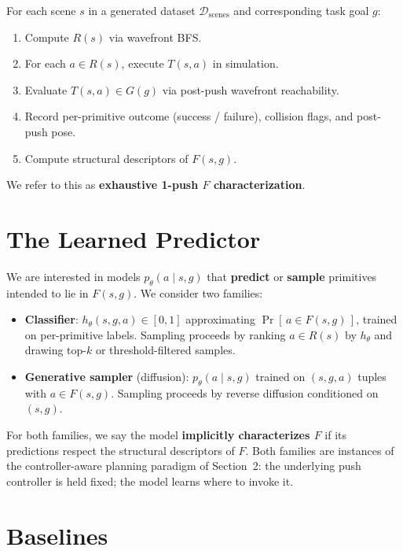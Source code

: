 \documentclass[11pt]{article}
\begin{document}
For each scene $s$ in a generated dataset $\mathcal{D}_{\text{scenes}}$ and
corresponding task goal $g$:
\begin{enumerate}[leftmargin=2em,itemsep=0pt]
  \item Compute $R(s)$ via wavefront BFS.
  \item For each $a \in R(s)$, execute $T(s, a)$ in simulation.
  \item Evaluate $T(s, a) \in G(g)$ via post-push wavefront reachability.
  \item Record per-primitive outcome (success / failure), collision flags,
        and post-push pose.
  \item Compute structural descriptors of $F(s, g)$.
\end{enumerate}

We refer to this as \textbf{exhaustive 1-push $F$ characterization}.

\section{The Learned Predictor}

We are interested in models $p_\theta(a \mid s, g)$ that \textbf{predict} or
\textbf{sample} primitives intended to lie in $F(s, g)$. We consider two
families:
\begin{itemize}[leftmargin=2em,itemsep=0pt]
  \item \textbf{Classifier}: $h_\theta(s, g, a) \in [0, 1]$ approximating
        $\Pr[\,a \in F(s, g)\,]$, trained on per-primitive labels. Sampling
        proceeds by ranking $a \in R(s)$ by $h_\theta$ and drawing top-$k$ or
        threshold-filtered samples.
  \item \textbf{Generative sampler} (diffusion): $p_\theta(a \mid s, g)$
        trained on $(s, g, a)$ tuples with $a \in F(s, g)$. Sampling proceeds
        by reverse diffusion conditioned on $(s, g)$.
\end{itemize}

For both families, we say the model \textbf{implicitly characterizes $F$} if
its predictions respect the structural descriptors of $F$. Both families are
instances of the controller-aware planning paradigm of Section~2: the
underlying push controller is held fixed; the model learns where to invoke
it.

\section{Baselines}\label{sec:baselines}
\end{document}
